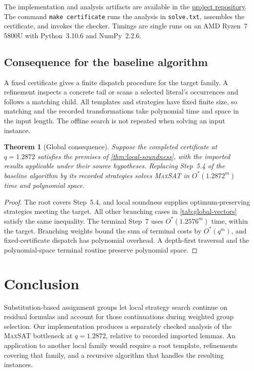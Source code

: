 \documentclass[10pt,twoside]{article}
\newcommand{\MaxSAT}{\textnormal{\textsc{MaxSAT}}}
\newcommand{\OhStar}{O^*}
\newtheorem{theorem}{Theorem}
\theoremstyle{definition}
\theoremstyle{remark}
\begin{document}
The implementation and analysis artifacts are available in the
\href{https://github.com/kisorimaD/maxsat_prover}{project repository}.
The command \texttt{make certificate} runs the analysis in \texttt{solve.txt},
assembles the certificate, and invokes the checker.
Timings are single runs on an AMD Ryzen~7 5800U with Python~3.10.6 and
NumPy~2.2.6.

\subsection{Consequence for the baseline algorithm}

A fixed certificate gives a finite dispatch procedure for the target family.
A refinement inspects a concrete tail or scans a selected literal's
occurrences and follows a matching child. All templates and strategies have
fixed finite size, so matching and the recorded transformations take
polynomial time and space in the input length. The offline search is not
repeated when solving an input instance.

\begin{theorem}[Global consequence]
\label{thm:conditional-global}
Suppose the completed certificate at $q=1.2872$ satisfies the premises of
\cref{thm:local-soundness}, with the imported results applicable under their
source hypotheses. Replacing Step~5.4 of the baseline algorithm by its
recorded strategies solves \MaxSAT{} in $\OhStar(1.2872^m)$ time and
polynomial space.
\end{theorem}
\begin{proof}
The root covers Step~5.4, and local soundness supplies optimum-preserving
strategies meeting the target. All other branching cases in
\cref{tab:global-vectors} satisfy the same inequality. The terminal
Step~7 uses $\OhStar(1.2576^m)$ time, within the target. Branching weights
bound the sum of terminal costs by $\OhStar(q^m)$, and fixed-certificate
dispatch has polynomial overhead. A depth-first traversal and the
polynomial-space terminal routine preserve polynomial space.
\end{proof}

\section{Conclusion}
\label{sec:conclusion}

Substitution-based assignment groups let local strategy search continue on
residual formulas and account for those continuations during weighted group
selection. Our implementation produces a separately checked analysis of the
\MaxSAT{} bottleneck at $q=1.2872$, relative to recorded imported lemmas.
An application to another local family would require a root template,
refinements covering that family, and a recursive algorithm that handles
the resulting instances.
\end{document}
